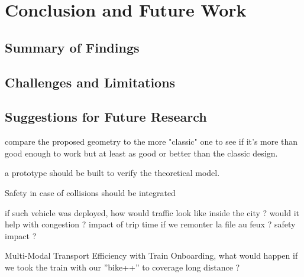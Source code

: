 \section{Conclusion and Future Work}

\subsection{Summary of Findings}

\subsection{Challenges and Limitations}

\subsection{Suggestions for Future Research}

compare the proposed geometry to the more "classic" one to see if it's more than good enough to work but at least as good or better than the classic design.

a prototype should be built to verify the theoretical model.

Safety in case of collisions should be integrated

if such vehicle was deployed, how would traffic look like inside the city ? would it help with congestion ? 
impact of trip time if we remonter la file au feux ? safety impact ?

Multi-Modal Transport Efficiency with Train Onboarding, what would happen if we took the train with our ”bike++” to coverage long distance ?